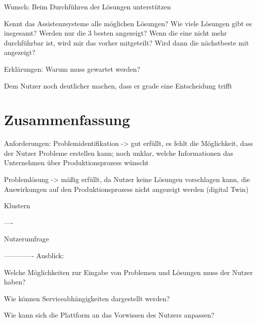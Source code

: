 Wunsch: Beim Durchführen der Lösungen unterstützen

Kennt das Assistenzsysteme alle möglichen Lösungen? Wie viele Lösungen gibt es insgesamt? Werden nur die 3 besten angezeigt? Wenn die eine nicht mehr durchführbar ist, wird mir das vorher mitgeteilt? Wird dann die nächstbeste mit angezeigt?

Erklärungen: Warum muss gewartet werden?

Dem Nutzer noch deutlicher machen, dass er grade eine Entscheidung trifft


\section{Zusammenfassung}
Anforderungen:
Problemidentifikation -> gut erfüllt, es fehlt die Möglichkeit, dass der Nutzer Probleme erstellen kann; noch unklar, welche Informationen das Unternehmen über Produktionsprozess wünscht

Problemlösung -> mäßig erfüllt, da Nutzer keine Lösungen vorschlagen kann, die Auswirkungen auf den Produktionsprozess nicht angezeigt werden (digital Twin)

Klustern

----

Nutzerumfrage

-------------
Ausblick:

Welche Möglichkeiten zur Eingabe von Problemen und Lösungen muss der Nutzer haben?

Wie können Serviceabhängigkeiten dargestellt werden?

Wie kann sich die Plattform an das Vorwissen des Nutzers anpassen?